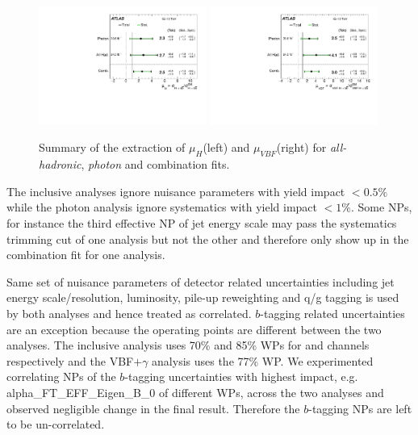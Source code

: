 \begin{figure}[htbp]
  \centering
  \includegraphics[width=0.49\textwidth]{figures/VBF/Plot_mu_summary_VBF.pdf}
  \includegraphics[width=0.49\textwidth]{figures/VBF/Plot_mu_summary_VBFonly.pdf}

\caption{Summary of the extraction of $\mu_{H}$(left) and $\mu_{VBF}$(right) for  \textit{all-hadronic}, \textit{photon} and combination fits.}
  \label{fig:vbf-summary}
\end{figure}




The inclusive analyses ignore nuisance parameters with yield impact $<0.5\%$ while the photon analysis ignore systematics with yield impact $<1\%$. Some NPs, for instance the third effective NP of jet energy scale may pass the systematics trimming cut of one analysis but not the other and therefore only show up in the combination fit for one analysis. 

Same set of nuisance parameters of detector related uncertainties including jet energy scale/resolution, luminosity, pile-up reweighting and q/g tagging is used by both analyses and hence treated as correlated.  $b$-tagging related uncertainties are an exception because the operating points are different between the two analyses. The inclusive analysis uses 70\% and 85\% WPs for \twocentral and \fourcentral channels respectively and the VBF$+\gamma$ analysis uses the 77\% WP. We experimented correlating NPs of the $b$-tagging uncertainties with highest impact, e.g. alpha\_FT\_EFF\_Eigen\_B\_0 of different WPs, across the two analyses and observed negligible change in the final result. Therefore the $b$-tagging NPs are left to be un-correlated.


